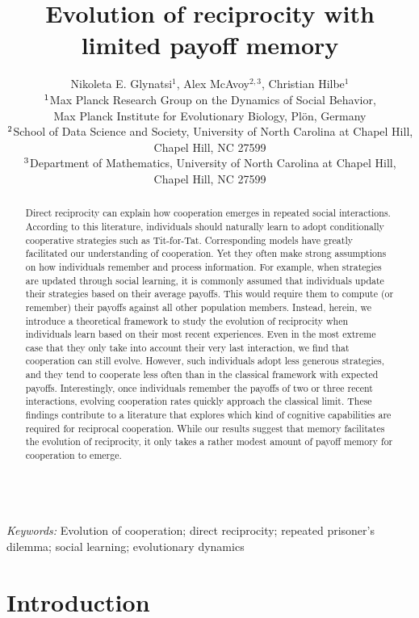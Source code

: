 \documentclass[11pt]{article}
\title{\bf  \sffamily \Large Evolution of reciprocity %
with limited payoff memory\\}
\date{}
\author{\parbox[c]{16cm}{\centering \onehalfspacing 
Nikoleta E. Glynatsi$^1$,  Alex McAvoy$^{2,3}$, Christian Hilbe$^1$\\
$^{\rm 1}$Max Planck Research Group on the Dynamics of Social Behavior,\\ Max Planck Institute for Evolutionary Biology, Pl\"{o}n, Germany \\
$^{\rm 2}$School of Data Science and Society, University of North Carolina at Chapel Hill,\\ Chapel Hill, NC 27599 \\
$^{\rm 3}$Department of Mathematics, University of North Carolina at Chapel Hill,\\ Chapel Hill, NC 27599}}
\theoremstyle{plainCl1}
\theoremstyle{plainCl2}
\begin{document}
\maketitle


\begin{abstract}
\noindent
Direct reciprocity can explain how cooperation emerges in repeated social interactions. 
According to this literature, individuals should naturally learn to adopt conditionally cooperative strategies such as Tit-for-Tat. %
Corresponding models have greatly facilitated our understanding of cooperation. 
Yet they often make strong assumptions on how individuals remember and process information. 
For example, when strategies are updated through social learning, it is commonly assumed that individuals update their strategies based on their average payoffs.  
This would require them to compute (or remember) their payoffs against all other population members.
Instead, herein, we introduce a theoretical framework to study the evolution of reciprocity when individuals learn based on their most recent experiences.
Even in the most extreme case that they only take into account their very last interaction, we find that cooperation can still evolve. 
However, such individuals adopt less generous strategies, and they tend to cooperate less often than in the classical framework with expected payoffs. 
Interestingly, once individuals remember the payoffs of two or three recent interactions, evolving cooperation rates quickly approach the classical limit. 
These findings contribute to a literature that explores which kind of cognitive capabilities are required for reciprocal cooperation. 
While our results suggest that memory facilitates the evolution of reciprocity, it only takes a rather modest amount of payoff memory for cooperation to emerge. 
\end{abstract}

~\\
{\it Keywords:} Evolution of cooperation; direct reciprocity; repeated prisoner's dilemma; social learning; evolutionary dynamics



\clearpage
\newpage



\section{Introduction}
\end{document}
